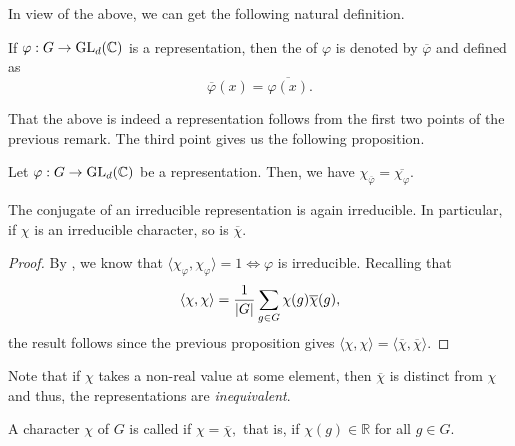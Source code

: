 In view of the above, we can get the following natural definition.

\begin{defn}%
	If $\varphi : G \to \operatorname{GL}_d(\mathbb{C})$ is a representation, then the  of $\varphi$ is denoted by $\overline{\varphi}$ and defined as
	\begin{equation*} 
		\overline{\varphi}(x) = \overline{\varphi(x)}.
	\end{equation*}
\end{defn}
That the above is indeed a representation follows from the first two points of the previous remark. The third point gives us the following proposition.

\begin{prop}
	Let $\varphi : G \to \operatorname{GL}_d(\mathbb{C})$ be a representation. Then, we have $\chi_{\overline{\varphi}} = \overline{\chi_\varphi}.$
\end{prop}

\begin{cor} \label{cor:conjofcharischar}
	The conjugate of an irreducible representation is again irreducible. In particular, if $\chi$ is an irreducible character, so is $\overline{\chi}.$
\end{cor}
\begin{proof} 
	By , we know that $\langle \chi_\varphi, \chi_\varphi\rangle = 1 \iff \varphi$ is irreducible. Recalling that
	\begin{equation*} 
		\langle \chi, \chi\rangle = \frac{1}{{\left\lvert G \right\lvert}}\sum_{g \in G}\chi(g)\overline{\chi}(g),
	\end{equation*}
	the result follows since the previous proposition gives $\langle \chi, \chi\rangle = \langle \overline{\chi}, \overline{\chi}\rangle.$
\end{proof}

\begin{rem}
	Note that if $\chi$ takes a non-real value at some element, then $\overline{\chi}$ is distinct from $\chi$ and thus, the representations are \emph{inequivalent}.
\end{rem}

\begin{defn}%
	A character $\chi$ of $G$ is called  if $\chi = \overline{\chi},$ that is, if $\chi(g) \in \mathbb{R}$ for all $g \in G.$
\end{defn}

